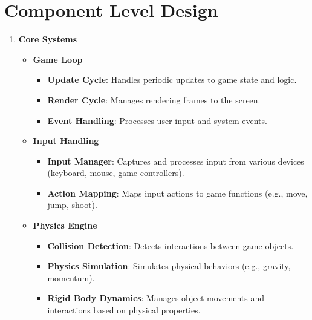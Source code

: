 \section{Component Level Design}
\begin{enumerate}
	\item \textbf{Core Systems}
	\begin{itemize}
		\item \textbf{Game Loop}
		\begin{itemize}
			\item \textbf{Update Cycle}: Handles periodic updates to game state and logic.
			\item \textbf{Render Cycle}: Manages rendering frames to the screen.
			\item \textbf{Event Handling}: Processes user input and system events.
		\end{itemize}
		\item \textbf{Input Handling}
		\begin{itemize}
			\item \textbf{Input Manager}: Captures and processes input from various devices (keyboard, mouse, game controllers).
			\item \textbf{Action Mapping}: Maps input actions to game functions (e.g., move, jump, shoot).
		\end{itemize}
		\item \textbf{Physics Engine}
		\begin{itemize}
			\item \textbf{Collision Detection}: Detects interactions between game objects.
			\item \textbf{Physics Simulation}: Simulates physical behaviors (e.g., gravity, momentum).
			\item \textbf{Rigid Body Dynamics}: Manages object movements and interactions based on physical properties.
		\end{itemize}
	\end{itemize}
	

\end{enumerate}
